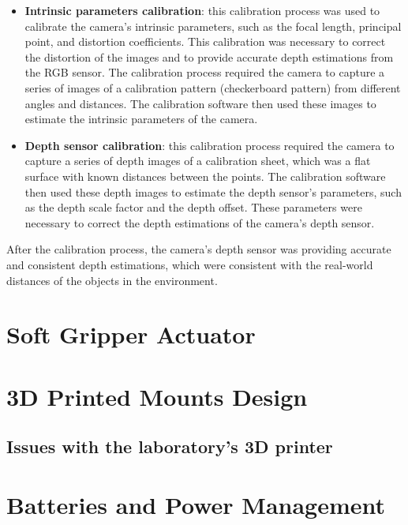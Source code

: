 \begin{itemize}
    \item \textbf{Intrinsic parameters calibration}: this calibration process was used to calibrate the camera's 
    intrinsic parameters,
    such as the focal length, principal point, and distortion coefficients. This calibration was necessary to correct
    the distortion of the images and to provide accurate depth estimations from the RGB sensor. The calibration process
    required the camera to capture a series of images of a calibration pattern (checkerboard pattern) from different angles
    and distances. The calibration software then used these images to estimate the intrinsic parameters of the camera.
    \item \textbf{Depth sensor calibration}: this calibration process required the camera to capture a series of
    depth images of a calibration sheet, which was a flat surface with known distances between the points. The calibration
    software then used these depth images to estimate the depth sensor's parameters, such as the depth scale factor
    and the depth offset. These parameters were necessary to correct the depth estimations of the camera's depth sensor.
\end{itemize}

After the calibration process, the camera's depth sensor was providing accurate and consistent depth estimations,
which were consistent with the real-world distances of the objects in the environment.

\section{Soft Gripper Actuator}

\section{3D Printed Mounts Design}

\subsection*{Issues with the laboratory's 3D printer}

\section{Batteries and Power Management}
